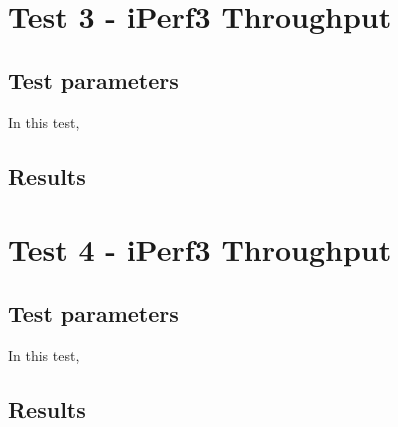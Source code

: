 \section{Test 3 - iPerf3 Throughput}
\subsection{Test parameters}
In this test, 
\subsection{Results}


\section{Test 4 - iPerf3 Throughput}
\subsection{Test parameters}
In this test, 
\subsection{Results}

